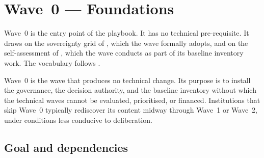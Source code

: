 
\chapter{Wave~0 --- Foundations}
\label{ch:wave0-foundations}

\begin{caveatbox}[Dependencies]
\noindent Wave~0 is the entry point of the playbook. It has no
technical pre-requisite. It draws on the sovereignty grid of
, which the wave formally adopts, and
on the self-assessment of , which the
wave conducts as part of its baseline inventory work. The vocabulary
follows .
\end{caveatbox}

Wave~0 is the wave that produces no technical change. Its purpose
is to install the governance, the decision authority, and the
baseline inventory without which the technical waves cannot be
evaluated, prioritised, or financed. Institutions that skip Wave~0
typically rediscover its content midway through Wave~1 or Wave~2,
under conditions less conducive to deliberation.

\section{Goal and dependencies}
\label{sec:w0-goal}

